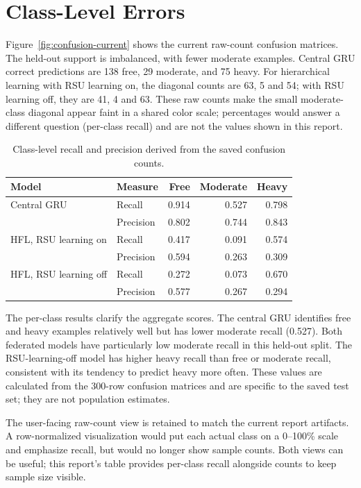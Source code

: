 \section{Class-Level Errors}
Figure~\ref{fig:confusion-current} shows the current raw-count confusion matrices. The held-out support is imbalanced, with fewer moderate examples. Central GRU correct predictions are 138 free, 29 moderate, and 75 heavy. For hierarchical learning with RSU learning on, the diagonal counts are 63, 5 and 54; with RSU learning off, they are 41, 4 and 63. These raw counts make the small moderate-class diagonal appear faint in a shared color scale; percentages would answer a different question (per-class recall) and are not the values shown in this report.

\begin{table}[ht]
\centering
\caption{Class-level recall and precision derived from the saved confusion counts.}
\label{tab:class-metrics}
\small
\begin{tabular}{llrrr}
\toprule
Model & Measure & Free & Moderate & Heavy\\
\midrule
Central GRU & Recall & 0.914 & 0.527 & 0.798\\
 & Precision & 0.802 & 0.744 & 0.843\\
HFL, RSU learning on & Recall & 0.417 & 0.091 & 0.574\\
 & Precision & 0.594 & 0.263 & 0.309\\
HFL, RSU learning off & Recall & 0.272 & 0.073 & 0.670\\
 & Precision & 0.577 & 0.267 & 0.294\\
\bottomrule
\end{tabular}
\end{table}

The per-class results clarify the aggregate scores. The central GRU identifies free and heavy examples relatively well but has lower moderate recall (0.527). Both federated models have particularly low moderate recall in this held-out split. The RSU-learning-off model has higher heavy recall than free or moderate recall, consistent with its tendency to predict heavy more often. These values are calculated from the 300-row confusion matrices and are specific to the saved test set; they are not population estimates.

The user-facing raw-count view is retained to match the current report artifacts. A row-normalized visualization would put each actual class on a 0--100\% scale and emphasize recall, but would no longer show sample counts. Both views can be useful; this report's table provides per-class recall alongside counts to keep sample size visible.

